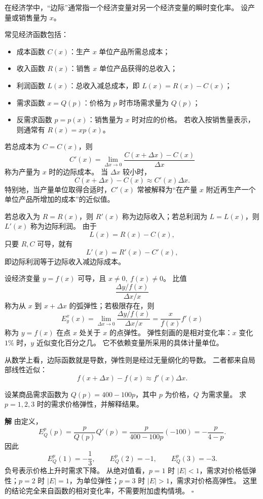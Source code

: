 \documentclass[fontset=fandol]{ctexart}
\newenvironment{solution}{\par\noindent\textbf{解}\quad}{\hfill$\square$\par\vspace{0.8em}}
\begin{document}
\begin{definition}[边际函数]
在经济学中，“边际”通常指一个经济变量对另一个经济变量的瞬时变化率。 设产量或销售量为 $x$。

常见经济函数包括：
\begin{itemize}[leftmargin=2em]
\item 成本函数 $C(x)$：生产 $x$ 单位产品所需总成本；
\item 收入函数 $R(x)$：销售 $x$ 单位产品获得的总收入；
\item 利润函数 $L(x)$：总收入减总成本，即 $L(x)=R(x)-C(x)$；
\item 需求函数 $x=Q(p)$：价格为 $p$ 时市场需求量为 $Q(p)$；
\item 反需求函数 $p=p(x)$：销售量为 $x$ 时对应的价格。 若收入按销售量表示，则通常有 $R(x)=xp(x)$。
\end{itemize}

若总成本为 $C=C(x)$，则
\[
C'(x)=\lim_{\Delta x\to0}\frac{C(x+\Delta x)-C(x)}{\Delta x}
\]
称为产量为 $x$ 时的边际成本。 当 $\Delta x$ 较小时，
\[
C(x+\Delta x)-C(x)\approx C'(x)\Delta x.
\]
特别地，当产量单位取得合适时，$C'(x)$ 常被解释为“在产量 $x$ 附近再生产一个单位产品所增加的成本”的近似值。

若总收入为 $R=R(x)$，则 $R'(x)$ 称为边际收入；若总利润为 $L=L(x)$，则 $L'(x)$ 称为边际利润。 由于
\[
L(x)=R(x)-C(x),
\]
只要 $R,C$ 可导，就有
\[
L'(x)=R'(x)-C'(x),
\]
即边际利润等于边际收入减边际成本。
\end{definition}

\begin{definition}[弹性]
设经济变量 $y=f(x)$ 可导，且 $x\neq0,\ f(x)\neq0$。 比值
\[
\frac{\Delta y/f(x)}{\Delta x/x}
\]
称为从 $x$ 到 $x+\Delta x$ 的弧弹性；若极限存在，则
\[
E_y^x(x)=\lim_{\Delta x\to0}\frac{\Delta y/f(x)}{\Delta x/x}
=\frac{x}{f(x)}f'(x)
\]
称为 $y=f(x)$ 在点 $x$ 处关于 $x$ 的点弹性。 弹性刻画的是相对变化率：$x$ 变化 $1\%$ 时，$y$ 近似变化百分之几。 它不依赖变量所采用的具体计量单位。
\end{definition}

从数学上看，边际函数就是导数，弹性则是经过无量纲化的导数。 二者都来自局部线性近似：
\[
f(x+\Delta x)-f(x)\approx f'(x)\Delta x.
\]

\begin{example}[需求价格弹性]
设某商品需求函数为 $Q(p)=400-100p$，其中 $p$ 为价格，$Q$ 为需求量。 求 $p=1,2,3$ 时的需求价格弹性，并解释结果。
\end{example}
\begin{solution}
由定义，
\[
E_Q^p(p)=\frac{p}{Q(p)}Q'(p)=\frac{p}{400-100p}(-100)=-\frac{p}{4-p}.
\]
因此
\[
E_Q^p(1)=-\frac13,\qquad E_Q^p(2)=-1,\qquad E_Q^p(3)=-3.
\]
负号表示价格上升时需求下降。 从绝对值看，$p=1$ 时 $|E|<1$，需求对价格低弹性；$p=2$ 时 $|E|=1$，为单位弹性；$p=3$ 时 $|E|>1$，需求对价格高弹性。 这里的结论完全来自函数的相对变化率，不需要附加虚构情境。
\end{solution}
\end{document}
